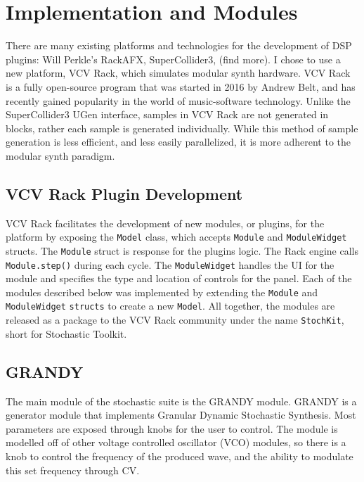 \documentclass[10pt]{article}
\begin{document}
\section{Implementation and Modules}
There are many existing platforms and technologies for the development of DSP plugins: Will Perkle's RackAFX, SuperCollider3, (find more).\citep{rackafx} I chose to use a new platform, VCV Rack, which simulates modular synth hardware. VCV Rack is a fully open-source program that was started in 2016 by Andrew Belt, and has recently gained popularity in the world of music-software technology.\citep{vcvrack} Unlike the SuperCollider3 UGen interface, samples in VCV Rack are not generated in blocks, rather each sample is generated individually. While this method of sample generation is less efficient, and less easily parallelized, it is more adherent to the modular synth paradigm.

\subsection{VCV Rack Plugin Development}

VCV Rack facilitates the development of new modules, or plugins, for the platform by exposing the \texttt{Model} class, which accepts \texttt{Module} and \texttt{ModuleWidget} structs. The \texttt{Module} struct is response for the plugins logic. The Rack engine calls \texttt{Module.step()} during each cycle. The \texttt{ModuleWidget} handles the UI for the module and specifies the type and location of controls for the panel. Each of the modules described below was implemented by extending the \texttt{Module} and \texttt{ModuleWidget} \texttt{structs} to create a new \texttt{Model}. All together, the modules are released as a package to the VCV Rack community under the name \texttt{StochKit}, short for Stochastic Toolkit.

\subsection{GRANDY}
The main module of the stochastic suite is the GRANDY module. GRANDY is a generator module that implements Granular Dynamic Stochastic Synthesis. Most parameters are exposed through knobs for the user to control. The module is modelled off of other voltage controlled oscillator (VCO) modules, so there is a knob to control the frequency of the produced wave, and the ability to modulate this set frequency through CV. 
\end{document}
